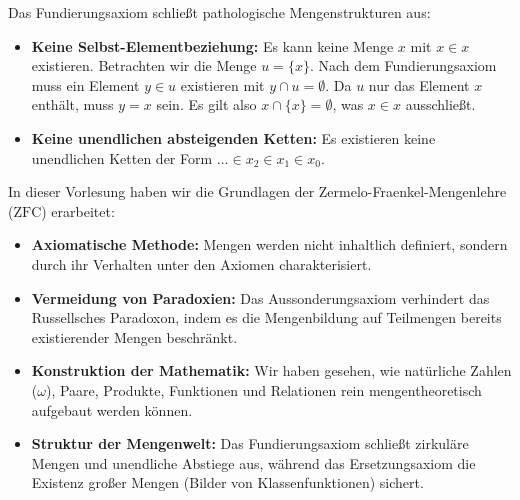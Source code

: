 \begin{math-stroke}
\begin{axioms}
\end{axioms}

\begin{explanation-of-steps}
Das Fundierungsaxiom schließt pathologische Mengenstrukturen aus:
\begin{itemize}
    \item \textbf{Keine Selbst-Elementbeziehung:} Es kann keine Menge $x$ mit $x \in x$ existieren. Betrachten wir die Menge $u = \{x\}$. Nach dem Fundierungsaxiom muss ein Element $y \in u$ existieren mit $y \cap u = \emptyset$. Da $u$ nur das Element $x$ enthält, muss $y = x$ sein. Es gilt also $x \cap \{x\} = \emptyset$, was $x \in x$ ausschließt.
    \item \textbf{Keine unendlichen absteigenden Ketten:} Es existieren keine unendlichen Ketten der Form $\dots \in x_2 \in x_1 \in x_0$.
\end{itemize}
\end{explanation-of-steps}
\end{math-stroke}

\begin{nice-box}
In dieser Vorlesung haben wir die Grundlagen der Zermelo-Fraenkel-Mengenlehre ($\text{ZFC}$) erarbeitet:
\begin{itemize}
    \item \textbf{Axiomatische Methode:} Mengen werden nicht inhaltlich definiert, sondern durch ihr Verhalten unter den Axiomen charakterisiert.
    \item \textbf{Vermeidung von Paradoxien:} Das Aussonderungsaxiom verhindert das Russellsches Paradoxon, indem es die Mengenbildung auf Teilmengen bereits existierender Mengen beschränkt.
    \item \textbf{Konstruktion der Mathematik:} Wir haben gesehen, wie natürliche Zahlen ($\omega$), Paare, Produkte, Funktionen und Relationen rein mengentheoretisch aufgebaut werden können.
    \item \textbf{Struktur der Mengenwelt:} Das Fundierungsaxiom schließt zirkuläre Mengen und unendliche Abstiege aus, während das Ersetzungsaxiom die Existenz großer Mengen (Bilder von Klassenfunktionen) sichert.
\end{itemize}
\end{nice-box}

